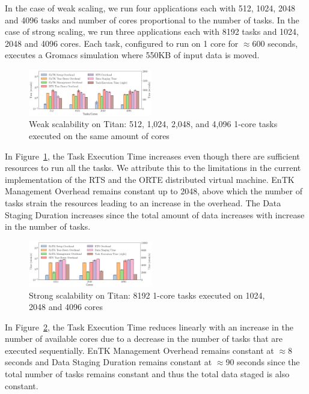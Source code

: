 In the case of weak scaling, we run four applications each with 512, 1024, 2048 
and 4096 tasks and number of cores proportional to the number of tasks. In the 
case of strong scaling, we run three applications each with 8192 tasks and 
1024, 2048 and 4096 cores. Each task, configured to run on 1 core for 
\(\approx\)600 seconds, executes a Gromacs simulation where 550KB of input data 
is moved.
\begin{figure}
\includegraphics[width=0.48\textwidth]{figs/weak_scaling_titan_orte_reduced.pdf}
\caption{Weak scalability on Titan: 512, 1,024, 2,048, and 4,096
1-core tasks executed on the same amount of cores}\label{fig:weak_scaling}
\end{figure}

In Figure~\ref{fig:weak_scaling}, the Task Execution Time increases even though
there are sufficient resources to run all the tasks. We attribute this to the
limitations in the current implementation of the RTS and the ORTE distributed 
virtual machine. EnTK Management Overhead remains constant up to 2048,
above which the number of tasks strain the resources leading to an increase in
the overhead. The Data Staging Duration increases since the total amount of 
data increases with increase in the number of tasks.

\begin{figure}
\includegraphics[width=0.48\textwidth]{figs/strong_scaling_titan_orte.pdf}
\caption{Strong scalability on Titan: 8192 1-core tasks executed on 1024, 
2048 and 4096 cores}\label{fig:strong_scaling}
\end{figure}

In Figure~\ref{fig:strong_scaling}, the Task Execution Time reduces linearly 
with an increase in the number of available cores due to a decrease in the 
number of tasks that are executed sequentially. EnTK Management Overhead 
remains constant at \(\approx\)8 seconds and Data Staging Duration remains 
constant at \(\approx\)90 seconds since the total number of tasks remains
constant and thus the total data staged is also constant.

